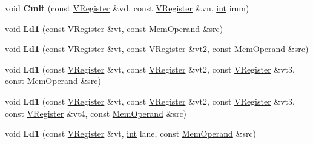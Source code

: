 \begin{DoxyCompactItemize}
void {\bfseries Cmlt} (const \mbox{\hyperlink{classv8_1_1internal_1_1VRegister}{V\+Register}} \&vd, const \mbox{\hyperlink{classv8_1_1internal_1_1VRegister}{V\+Register}} \&vn, \mbox{\hyperlink{classint}{int}} imm)
\item 
\mbox{\label{classv8_1_1internal_1_1MacroAssembler_a9e4ebaffa544b94003a4c2f022ae36ad}} 
void {\bfseries Ld1} (const \mbox{\hyperlink{classv8_1_1internal_1_1VRegister}{V\+Register}} \&vt, const \mbox{\hyperlink{classv8_1_1internal_1_1MemOperand}{Mem\+Operand}} \&src)
\item 
\mbox{\label{classv8_1_1internal_1_1MacroAssembler_a71724552a13617cbcf8692ce12a3a280}} 
void {\bfseries Ld1} (const \mbox{\hyperlink{classv8_1_1internal_1_1VRegister}{V\+Register}} \&vt, const \mbox{\hyperlink{classv8_1_1internal_1_1VRegister}{V\+Register}} \&vt2, const \mbox{\hyperlink{classv8_1_1internal_1_1MemOperand}{Mem\+Operand}} \&src)
\item 
\mbox{\label{classv8_1_1internal_1_1MacroAssembler_aff1a0d8f7b0fc6c90a2b6282673e436d}} 
void {\bfseries Ld1} (const \mbox{\hyperlink{classv8_1_1internal_1_1VRegister}{V\+Register}} \&vt, const \mbox{\hyperlink{classv8_1_1internal_1_1VRegister}{V\+Register}} \&vt2, const \mbox{\hyperlink{classv8_1_1internal_1_1VRegister}{V\+Register}} \&vt3, const \mbox{\hyperlink{classv8_1_1internal_1_1MemOperand}{Mem\+Operand}} \&src)
\item 
\mbox{\label{classv8_1_1internal_1_1MacroAssembler_ae6477818c20f18e18da9834ff9da5a68}} 
void {\bfseries Ld1} (const \mbox{\hyperlink{classv8_1_1internal_1_1VRegister}{V\+Register}} \&vt, const \mbox{\hyperlink{classv8_1_1internal_1_1VRegister}{V\+Register}} \&vt2, const \mbox{\hyperlink{classv8_1_1internal_1_1VRegister}{V\+Register}} \&vt3, const \mbox{\hyperlink{classv8_1_1internal_1_1VRegister}{V\+Register}} \&vt4, const \mbox{\hyperlink{classv8_1_1internal_1_1MemOperand}{Mem\+Operand}} \&src)
\item 
\mbox{\label{classv8_1_1internal_1_1MacroAssembler_a928e4520937e8fcf86b0b2a2b29b2e70}} 
void {\bfseries Ld1} (const \mbox{\hyperlink{classv8_1_1internal_1_1VRegister}{V\+Register}} \&vt, \mbox{\hyperlink{classint}{int}} lane, const \mbox{\hyperlink{classv8_1_1internal_1_1MemOperand}{Mem\+Operand}} \&src)

\end{DoxyCompactItemize}
